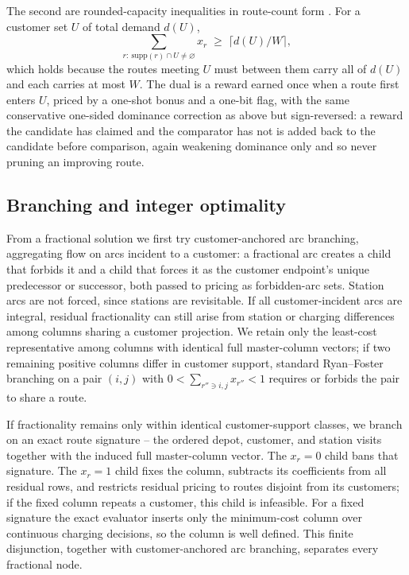 \documentclass[review,3p,authoryear]{elsarticle}
\theoremstyle{plain}
\theoremstyle{definition}
\theoremstyle{remark}
\begin{document}
The second are rounded-capacity inequalities in route-count form
\citep{LysgaardLetchfordEglese2004}. For a customer set $U$ of total demand $d(U)$,
\begin{equation}
\label{eq:rcc}
\sum_{r:\ \mathrm{supp}(r)\cap U\ne\varnothing} x_r \;\ge\; \bigl\lceil d(U)/W \bigr\rceil,
\end{equation}
which holds because the routes meeting $U$ must between them carry all of $d(U)$ and
each carries at most $W$. The dual is a reward earned once when a route first enters
$U$, priced by a one-shot bonus and a one-bit flag, with the same conservative one-sided
dominance correction as above but sign-reversed: a reward the candidate has claimed and
the comparator has not is added back to the candidate before comparison, again weakening
dominance only and so never pruning an improving route.

\subsection{Branching and integer optimality}
\label{sec:branching}

From a fractional solution we first try customer-anchored arc branching,
aggregating flow on arcs incident to a customer: a fractional arc creates a child that
forbids it and a child that forces it as the customer endpoint's unique predecessor or
successor, both passed to pricing as forbidden-arc sets. Station arcs are not forced,
since stations are revisitable. If all customer-incident arcs are integral, residual
fractionality can still arise from station or charging differences among columns sharing
a customer projection. We retain only the least-cost representative among columns with
identical full master-column vectors; if two remaining positive columns differ in
customer support, standard Ryan--Foster branching on a pair $(i,j)$ with
$0<\sum_{r''\ni i,j}x_{r''}<1$ requires or forbids the pair to share a route.

If fractionality remains only within identical customer-support classes, we branch on an
exact route signature -- the ordered depot, customer, and station visits together with
the induced full master-column vector. The $x_r=0$ child bans that signature. The
$x_r=1$ child fixes the column,
subtracts its coefficients from all residual rows, and restricts residual pricing to
routes disjoint from its customers; if the fixed column repeats a customer, this child
is infeasible. For a fixed signature the exact evaluator inserts only the minimum-cost
column over continuous charging decisions, so the column is well defined. This finite
disjunction, together with customer-anchored arc branching, separates every fractional
node.
\end{document}
